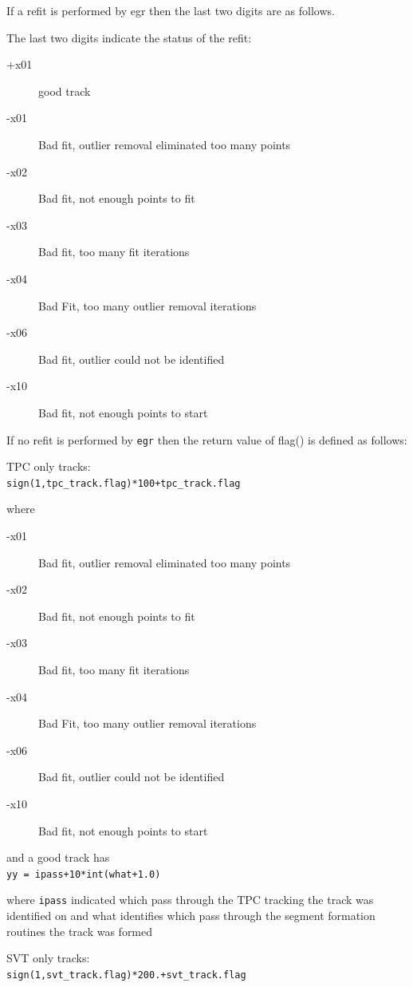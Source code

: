 \documentclass[twoside]{article}
\begin{document}
    If a refit is performed by egr then the last two digits are as follows.

    The last two digits indicate the status of the refit:
    \begin{description}
    \item[+x01] good track 
    \item[-x01] Bad fit, outlier removal eliminated too many points 
    \item[-x02] Bad fit, not enough points to fit 
    \item[-x03] Bad fit, too many fit iterations 
    \item[-x04] Bad Fit, too many outlier removal iterations 
    \item[-x06] Bad fit, outlier could not be identified 
    \item[-x10] Bad fit, not enough points to start 
    \end{description} 

    If no refit is performed by \texttt{egr} then the return value of flag()
    is defined as follows: 

    TPC only tracks:\\
    \texttt{sign(1,tpc\_track.flag)*100+tpc\_track.flag}

    where 
  
    \begin{description}
    \item[-x01] Bad fit, outlier removal eliminated too many points 
    \item[-x02] Bad fit, not enough points to fit 
    \item[-x03] Bad fit, too many fit iterations 
    \item[-x04] Bad Fit, too many outlier removal iterations 
    \item[-x06] Bad fit, outlier could not be identified 
    \item[-x10] Bad fit, not enough points to start 
    \end{description} 

       and a good track has\\ 
           \texttt{yy = ipass+10*int(what+1.0) }

     where \texttt{ipass} indicated which pass through the TPC tracking the track
     was identified on and what identifies which pass through the segment formation
     routines the track was formed   

     SVT only tracks:\\ 
     \texttt{sign(1,svt\_track.flag)*200.+svt\_track.flag}
\end{document}
